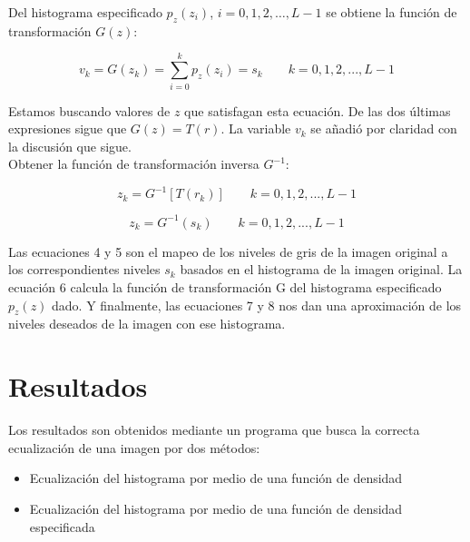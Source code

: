 \documentclass{article}
\begin{document}
Del histograma especificado $p_{z}(z_{i})$, $i=0, 1, 2, …, L-1$ se obtiene la función de transformación $G(z)$:

\begin{equation}
v_{k}=G(z_{k})=\sum \limits_{i=0}^{k} p_{z}(z_{i})=s_{k} \qquad k=0,1,2,...,L-1
\end{equation}

Estamos buscando valores de $z$ que satisfagan esta ecuación. De las dos últimas expresiones sigue que $G(z)=T(r)$. La variable $v_{k}$ se añadió por claridad con la discusión que sigue.\\

Obtener la función de transformación inversa $G^{-1}$:

\begin{equation}
z_{k}=G^{-1}[T(r_{k})] \qquad k=0,1,2,...,L-1
\end{equation}

\begin{equation}
z_{k}=G^{-1}(s_{k}) \qquad k=0,1,2,...,L-1
\end{equation}

Las ecuaciones 4 y 5  son el mapeo de los niveles de gris de la imagen original a los correspondientes niveles $s_{k}$ basados en el histograma de la imagen original. La ecuación 6 calcula la función de transformación G del histograma especificado $p_{z}(z)$ dado. Y finalmente, las ecuaciones 7 y 8 nos dan una aproximación de los niveles deseados de la imagen con ese histograma.

\section{Resultados}\label{sec:res}
Los resultados son obtenidos mediante un programa que busca la correcta ecualización de una imagen por dos métodos:

\begin{itemize}
\item Ecualización del histograma por medio de una función de densidad
\item Ecualización del histograma por medio de una función de densidad especificada
\end{itemize}
\end{document}
